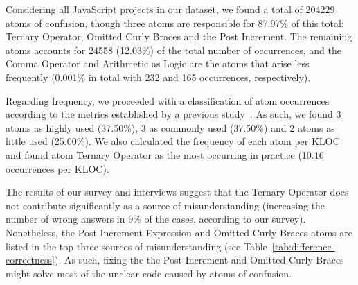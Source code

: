 Considering all JavaScript projects in our dataset, we found 
a total of \num{204229} atoms of confusion, though three atoms are responsible for 87.97\% of this total: Ternary Operator, Omitted Curly Braces and the Post Increment. The remaining atoms accounts for \num{24558} (12.03\%) of the total number of occurrences, and the Comma Operator and Arithmetic as Logic are the atoms that arise less frequently (0.001\% in total with 232 and 165 occurrences, respectively). 

Regarding frequency, we proceeded with a classification of atom occurrences according to the metrics established by a previous study~\cite{DBLP:journals/ese/MedeirosLAAKRG19}. As such, we found 3 atoms as highly used (37.50\%), 3 as commonly used (37.50\%) and 2 atoms as little used (25.00\%). We also calculated the frequency of each atom per KLOC and found atom Ternary Operator as the most occurring in practice (10.16 occurrences per KLOC).

The results of our survey and interviews suggest that the Ternary Operator does not contribute significantly as a source of misunderstanding (increasing the number of wrong answers in 9\% of the cases, according to our survey). Nonetheless, the Post Increment Expression and Omitted Curly Braces atoms are listed in the top three sources of misunderstanding 
(see Table~\ref{tab:difference-correctness}). As such, fixing the the Post Increment and Omitted Curly Braces might solve most of the unclear code caused by atoms of confusion. 

